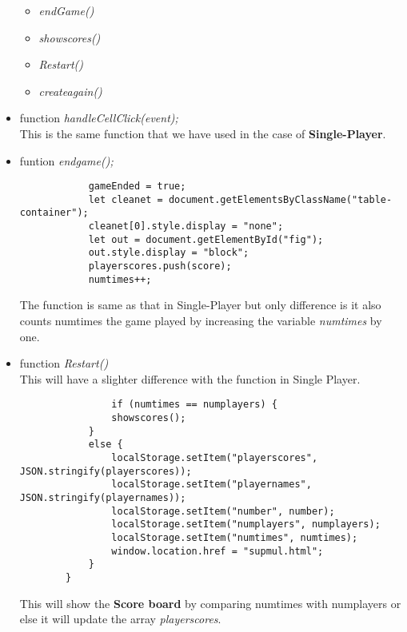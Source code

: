 \documentclass[a4paper, 11pt]{article}
\begin{document}
\begin{itemize}
\begin{itemize}
                \item \textit{endGame()}
                \item \textit{showscores()}
                \item \textit{Restart()}
                \item \textit{createagain()}
            \end{itemize}
        \item function \textit{handleCellClick(event);}
        \\ This is the same function that we have used in the case of \textbf{Single-Player}.
        \item funtion \textit{endgame();}
        \begin{lstlisting}
            gameEnded = true;
            let cleanet = document.getElementsByClassName("table-container");
            cleanet[0].style.display = "none";
            let out = document.getElementById("fig");
            out.style.display = "block";
            playerscores.push(score);
            numtimes++;
        \end{lstlisting}
         The function is same as that in Single-Player but only difference is it also counts numtimes the game played by increasing the variable \textit{numtimes} by one.
        \item function \textit{Restart()} 
           \\ This will have a slighter difference with the function in Single Player.

            \begin{lstlisting}
                if (numtimes == numplayers) {
                showscores();
            }
            else {
                localStorage.setItem("playerscores", JSON.stringify(playerscores));
                localStorage.setItem("playernames", JSON.stringify(playernames));
                localStorage.setItem("number", number);
                localStorage.setItem("numplayers", numplayers);
                localStorage.setItem("numtimes", numtimes);
                window.location.href = "supmul.html";
            }
        }
            \end{lstlisting}
            This will show the \textbf{Score board} by comparing numtimes with numplayers or else it will update the array \textit{playerscores}. 
          

\end{itemize}
\end{document}
